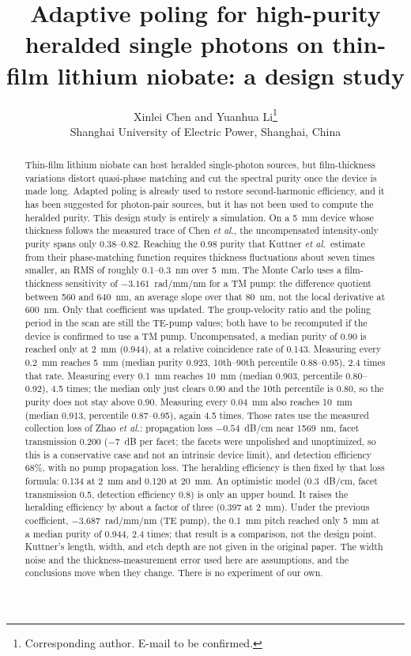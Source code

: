 \documentclass[11pt,a4paper]{article}
\title{Adaptive poling for high-purity heralded single photons on thin-film lithium niobate: a design study}
\author{%
Xinlei Chen and Yuanhua Li\thanks{Corresponding author. E-mail to be confirmed.}\\
Shanghai University of Electric Power, Shanghai, China%
}
\date{}
\begin{document}
\maketitle

\begin{abstract}
Thin-film lithium niobate can host heralded single-photon sources, but film-thickness variations distort quasi-phase matching and cut the spectral purity once the device is made long.
Adapted poling is already used to restore second-harmonic efficiency, and it has been suggested for photon-pair sources, but it has not been used to compute the heralded purity.
This design study is entirely a simulation.
On a 5~mm device whose thickness follows the measured trace of Chen \emph{et al.}, the uncompensated intensity-only purity spans only 0.38--0.82.
Reaching the 0.98 purity that Kuttner \emph{et al.}\ estimate from their phase-matching function requires thickness fluctuations about seven times smaller, an RMS of roughly 0.1--0.3~nm over 5~mm.
The Monte Carlo uses a film-thickness sensitivity of $-3.161$~rad/mm/nm for a TM pump: the difference quotient between 560 and 640~nm, an average slope over that 80~nm, not the local derivative at 600~nm.
Only that coefficient was updated.
The group-velocity ratio and the poling period in the scan are still the TE-pump values; both have to be recomputed if the device is confirmed to use a TM pump.
Uncompensated, a median purity of 0.90 is reached only at 2~mm (0.944), at a relative coincidence rate of 0.143.
Measuring every 0.2~mm reaches 5~mm (median purity 0.923, 10th--90th percentile 0.88--0.95), 2.4 times that rate.
Measuring every 0.1~mm reaches 10~mm (median 0.903, percentile 0.80--0.92), 4.5 times; the median only just clears 0.90 and the 10th percentile is 0.80, so the purity does not stay above 0.90.
Measuring every 0.04~mm also reaches 10~mm (median 0.913, percentile 0.87--0.95), again 4.5 times.
Those rates use the measured collection loss of Zhao \emph{et al.}: propagation loss $-0.54$~dB/cm near 1569~nm, facet transmission 0.200 ($-7$~dB per facet; the facets were unpolished and unoptimized, so this is a conservative case and not an intrinsic device limit), and detection efficiency 68\%, with no pump propagation loss.
The heralding efficiency is then fixed by that loss formula: 0.134 at 2~mm and 0.120 at 20~mm.
An optimistic model (0.3~dB/cm, facet transmission 0.5, detection efficiency 0.8) is only an upper bound.
It raises the heralding efficiency by about a factor of three (0.397 at 2~mm).
Under the previous coefficient, $-3.687$~rad/mm/nm (TE pump), the 0.1~mm pitch reached only 5~mm at a median purity of 0.944, 2.4 times; that result is a comparison, not the design point.
Kuttner's length, width, and etch depth are not given in the original paper.
The width noise and the thickness-measurement error used here are assumptions, and the conclusions move when they change.
There is no experiment of our own.
\end{abstract}
\end{document}
